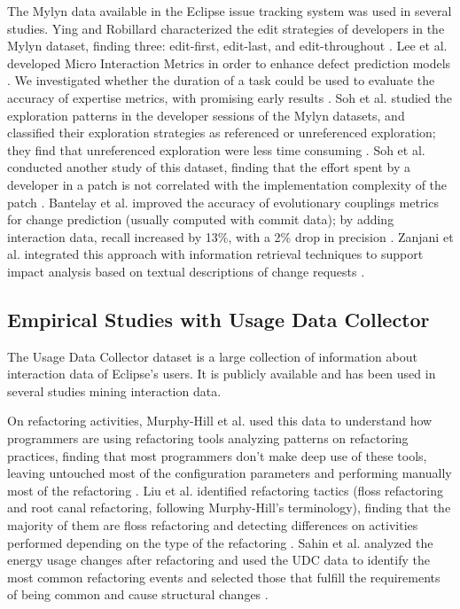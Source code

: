 \documentclass[times]{smrauth}
\begin{document}
The Mylyn data available in the Eclipse issue tracking system was used in several studies. Ying and Robillard characterized the edit strategies of developers in the Mylyn dataset, finding three: edit-first, edit-last, and edit-throughout \cite{YR11}. Lee et al. developed Micro Interaction Metrics in order to enhance defect prediction models \cite{LJD11}. We investigated whether the duration of a task could be used to evaluate the accuracy of expertise metrics, with promising early results \cite{RD13}. Soh et al. studied the exploration patterns in the developer sessions of the Mylyn datasets, and classified their exploration strategies as referenced or unreferenced exploration; they find that unreferenced exploration were less time consuming \cite{SKGAA13}. Soh et al. conducted another study of this dataset, finding that the effort spent by a developer in a patch is not correlated with the implementation complexity of the patch \cite{SKGA13}. Bantelay et al. improved the accuracy of evolutionary couplings metrics for change prediction (usually computed with commit data); by adding interaction data, recall increased by 13\%, with a 2\% drop in precision \cite{BZK13}. Zanjani et al. integrated this approach with information retrieval techniques to support impact analysis based on textual descriptions of change requests \cite{ZSK14}.

\subsection{Empirical Studies with Usage Data Collector}
The Usage Data Collector dataset is a large collection of information about interaction data of Eclipse's users. It is publicly available and has been used in several studies mining interaction data. 

On refactoring activities, Murphy-Hill et al. used this data to understand how programmers are using refactoring tools analyzing patterns on refactoring practices, finding that most programmers don't make deep use of these tools, leaving untouched most of the configuration parameters and performing manually most of the refactoring  \cite{MPB12}. Liu et al. identified refactoring tactics (floss refactoring and root canal refactoring, following Murphy-Hill's terminology), finding that the majority of them are floss refactoring and detecting differences on activities performed depending on the type of the refactoring \cite{LGN12}. Sahin et al. analyzed the energy usage changes after refactoring and used the UDC data to identify the most common refactoring events and selected those that fulfill the requirements of being common and cause structural changes \cite{SPC14}. 
\end{document}
